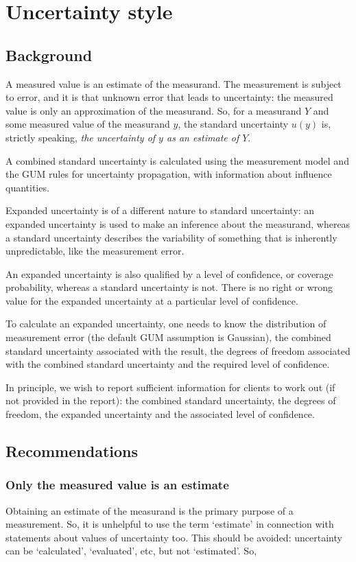 \section{Uncertainty style}
\subsection{Background}
A measured value is an estimate of the measurand. The measurement is subject to error, and it is that unknown error that leads to uncertainty: the measured value is only an approximation of the measurand. So, for a measurand $Y$ and some measured value of the measurand $y$, the standard uncertainty $u(y)$ is, strictly speaking, \textit{the uncertainty of $y$ as an estimate of $Y$}.

A combined standard uncertainty is calculated using the measurement model and the GUM rules for uncertainty propagation, with information about influence quantities. 

Expanded uncertainty is of a different nature to standard uncertainty: an expanded uncertainty is used to make an inference about the measurand, whereas a standard uncertainty describes the variability of something that is inherently unpredictable, like the measurement error.
 
An expanded uncertainty is also qualified by a level of confidence, or coverage probability, whereas a standard uncertainty is not. There is no right or wrong value for the expanded uncertainty at a particular level of confidence.

To calculate an expanded uncertainty, one needs to know the distribution of measurement error (the default GUM assumption is Gaussian), the combined standard uncertainty associated with the result, the degrees of freedom associated with the combined standard uncertainty and the required level of confidence. 

In principle, we wish to report sufficient information for clients to work out (if not provided in the report): the combined standard uncertainty, the degrees of freedom, the expanded uncertainty and the associated level of confidence. 

\subsection{Recommendations}
\subsubsection{Only the measured value is an estimate}
Obtaining an estimate of the measurand is the primary purpose of a measurement. So, it is unhelpful to use the term ‘estimate’ in connection with statements about values of uncertainty too. This should be avoided: uncertainty can be ‘calculated’, ‘evaluated’, etc, but not ‘estimated’. So,

